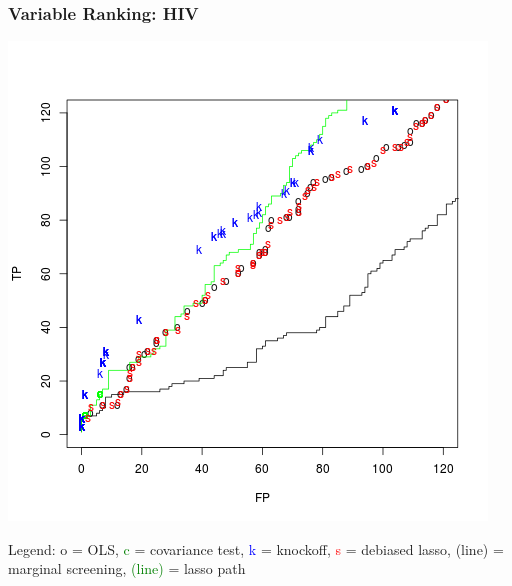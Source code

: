 \documentclass{beamer}
\begin{document}
\begin{frame}
\frametitle{Variable Ranking: HIV}
\begin{center}
\includegraphics[scale = 0.35]{HIV_tvf.png}
\end{center}

Legend: o = OLS, \textcolor{green}{c} = covariance test,
\textcolor{blue}{k} = knockoff, \textcolor{red}{s} = debiased lasso,
(line) = marginal screening, \textcolor{green}{(line)} = lasso path
\end{frame}
\end{document}
